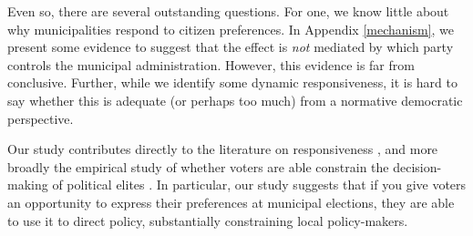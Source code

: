 \documentclass[a4paper,12pt]{article}
\begin{document}
Even so, there are several outstanding questions. For one, we know little about why municipalities respond to citizen preferences. In Appendix \ref{mechanism}, we present some evidence to suggest that the effect is \textit{not} mediated by which party controls the municipal administration. However, this evidence is far from conclusive. Further, while we identify some dynamic responsiveness, it is hard to say whether this is adequate (or perhaps too much) from a normative democratic perspective.

Our study contributes directly to the literature on responsiveness \citep{tausanovitch2014representation}, and more broadly the empirical study of whether voters are able constrain the decision-making of political elites \citep{berry2009imperfect}. In particular, our study suggests that if you give voters an opportunity to express their preferences at municipal elections, they are able to use it to direct policy, substantially constraining local policy-makers.





\onehalfspacing



\clearpage

\renewcommand{\thesubsection}{\Alph{subsection}}
\renewcommand{\thetable}{\Alph{subsection}\arabic{table}}
\renewcommand{\thefigure}{\Alph{subsection}\arabic{figure}}
\end{document}
